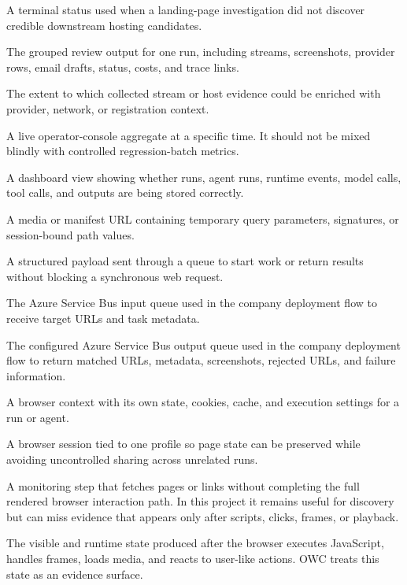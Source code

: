 \begin{description}[leftmargin=4.55cm,labelwidth=4.15cm,labelsep=0.4cm,style=sameline,itemsep=0.34em,topsep=0.35em,parsep=0pt]
  \item[\texttt{no\_hosting\_pages}] A terminal status used when a landing-page investigation did not discover credible downstream hosting candidates.
  \item[Evidence bundle] The grouped review output for one run, including streams, screenshots, provider rows, email drafts, status, costs, and trace links.
  \item[Provider coverage] The extent to which collected stream or host evidence could be enriched with provider, network, or registration context.
  \item[Dashboard snapshot] A live operator-console aggregate at a specific time. It should not be mixed blindly with controlled regression-batch metrics.
  \item[Persistence health] A dashboard view showing whether runs, agent runs, runtime events, model calls, tool calls, and outputs are being stored correctly.
  \item[Tokenized URL] A media or manifest URL containing temporary query parameters, signatures, or session-bound path values.
  \item[Queue message] A structured payload sent through a queue to start work or return results without blocking a synchronous web request.
  \item[\texttt{agent\_tasks}] The Azure Service Bus input queue used in the company deployment flow to receive target URLs and task metadata.
  \item[Results queue] The configured Azure Service Bus output queue used in the company deployment flow to return matched URLs, metadata, screenshots, rejected URLs, and failure information.
  \item[Browser profile] A browser context with its own state, cookies, cache, and execution settings for a run or agent.
  \item[Profile-scoped session] A browser session tied to one profile so page state can be preserved while avoiding uncontrolled sharing across unrelated runs.
  \item[Static collection] A monitoring step that fetches pages or links without completing the full rendered browser interaction path. In this project it remains useful for discovery but can miss evidence that appears only after scripts, clicks, frames, or playback.
  \item[Rendered browser state] The visible and runtime state produced after the browser executes JavaScript, handles frames, loads media, and reacts to user-like actions. OWC treats this state as an evidence surface.

\end{description}
